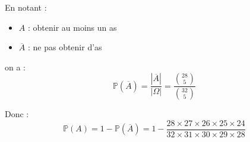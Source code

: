 \documentclass[11pt,a4paper]{article}
\begin{document}
En notant :
\begin{itemize}
    \item $A$ : obtenir au moins un as
    \item $\overline{A}$ : ne pas obtenir d'as
\end{itemize}
on a :
$$ \mathbb{P}(\overline{A}) = \frac{|\overline{A}|}{|\Omega|} = \frac{\binom{28}{5}}{\binom{32}{5}} $$

Donc :
$$ \mathbb{P}(A) = 1 - \mathbb{P}(\overline{A}) = 1 - \frac{28 \times 27 \times 26 \times 25 \times 24}{32 \times 31 \times 30 \times 29 \times 28} $$
\end{document}
